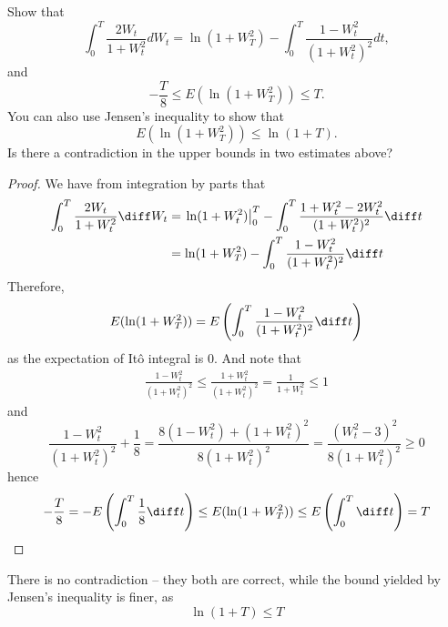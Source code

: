     \problem
    \begin{question}
        Show that
        \[\int_0^T \frac{2W_t}{1+W_t^2}dW_t=\ln (1+W_T^2)-\int_0^T \frac{1-W_t^2}{(1+W_t^2)^2}dt,\]
        and
        \[-\frac{T}{8}\leq E(\ln (1+W_T^2))\leq T.\]
        You can also use Jensen's inequality to show that
        \[ E(\ln (1+W_T^2))\leq \ln (1+T).\]
        Is there a contradiction in the upper bounds in two estimates above?
    \end{question}
    \begin{proof}
        We have from integration by parts that
        \[\begin{aligned}
            \int_0^T\frac{2W_t}{1+W_t^2}\diff W_t
            &=\left.\ln(1+W_t^2)\right|_0^T
            -\int_0^T\frac{1+W_t^2-2W_t^2}{(1+W_t^2)^2}\diff t\\
            &=\ln(1+W_T^2)-\int_0^T\frac{1-W_t^2}{(1+W_t^2)^2}\diff t
        \end{aligned}\]
        Therefore,
        \[E(\ln(1+W_T^2))=E\left(
            \int_0^T\frac{1-W^2_t}{(1+W_t^2)^2}\diff t
        \right)\]
        as the expectation of It\^o integral is 0.
        And note that
        \[\begin{aligned}
            \frac{1-W_t^2}{(1+W_t^2)^2}\leq\frac{1+W_t^2}{(1+W_t^2)^2}
            =\frac{1}{1+W_t^2}\leq 1
        \end{aligned}\]
        and
        \[\frac{1-W_t^2}{(1+W_t^2)^2}+\frac{1}{8}
        =\frac{8(1-W_t^2)+(1+W_t^2)^2}{8(1+W_t^2)^2}
        =\frac{(W_t^2-3)^2}{8(1+W_t^2)^2}\geq 0\]
        hence
        \[-\frac{T}{8}=-E\left(\int_0^T\frac{1}{8}\diff t\right)
        \leq E(\ln(1+W_T^2))
        \leq E\left(\int_0^T\diff t\right)=T\]
    \end{proof}
    There is no contradiction -- they both are correct, while the
    bound yielded by Jensen's inequality is finer, as
    \[\ln(1+T)\leq T\]

